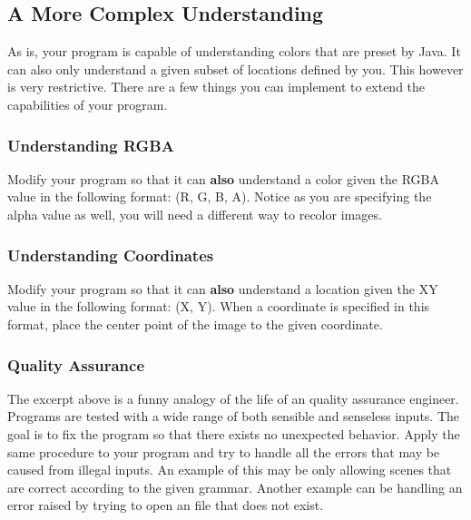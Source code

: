 \documentclass[a4paper]{article}
\begin{document}
	\subsection{A More Complex Understanding}
	As is, your program is capable of understanding colors that are preset by Java. It can also only understand a given subset of locations defined by you. This however is very restrictive. There are a few things you can implement to extend the capabilities of your program.
	
	\subsubsection{Understanding RGBA}
	Modify your program so that it can \textbf{also} understand a color given the RGBA value in the following format: (R, G, B, A). Notice as you are specifying the alpha value as well, you will need a different way to recolor images.
	
	\subsubsection{Understanding Coordinates}
	Modify your program so that it can \textbf{also} understand a location given the XY value in the following format: (X, Y). When a coordinate is specified in this format, place the center point of the image to the given coordinate.
	
	\subsubsection{Quality Assurance}
	\begin{center}
	\end{center}

	The excerpt above is a funny analogy of the life of an quality assurance engineer. Programs are tested with a wide range of both sensible and senseless inputs. The goal is to fix the program so that there exists no unexpected behavior. Apply the same procedure to your program and try to handle all the errors that may be caused from illegal inputs. An example of this may be only allowing scenes that are correct according to the given grammar. Another example can be handling an error raised by trying to open an file that does not exist.
	
\end{document}
